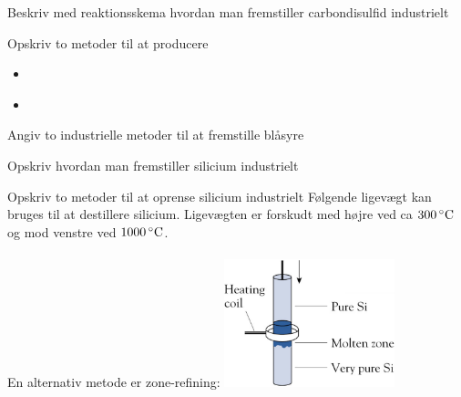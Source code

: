 \begin{flashcard}[Fremstilling]{Beskriv med reaktionsskema hvordan man fremstiller carbondisulfid industrielt}
\end{flashcard}

\begin{flashcard}[Fremstilling]{Opskriv to metoder til at producere }
\begin{itemize}
\item {}\\
\item {}
 \end{itemize}
\end{flashcard}

\begin{flashcard}[Fremstilling]{Angiv to industrielle metoder til at fremstille blåsyre}
\\ \vspace{7pt}
\end{flashcard}

\begin{flashcard}[Fremstilling]{Opskriv hvordan man fremstiller silicium industrielt}
\end{flashcard}

\begin{flashcard}[Fremstilling]{Opskriv to metoder til at oprense silicium industrielt}
Følgende ligevægt kan bruges til at destillere silicium. Ligevægten er forskudt med højre ved ca $300\,^{\circ}{\rm C}$ og mod venstre ved $1000\,^{\circ}{\rm C}$.\\
\\ \vspace{7pt}
En alternativ metode er zone-refining:
\includegraphics[width=0.37\textwidth]{figures/k14s340ZoneRefining.png}
\end{flashcard}

